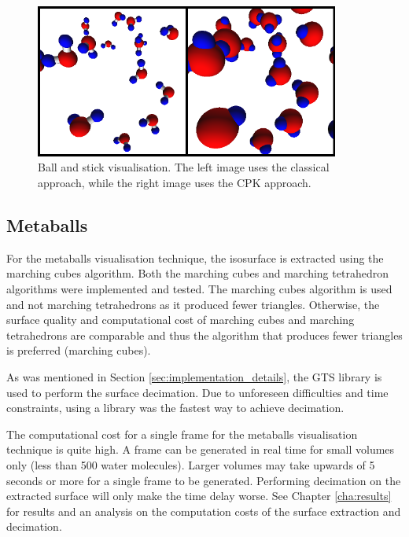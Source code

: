 \begin{figure}[h!]
  \begin{center}
    \includegraphics[width=100mm]{ballstick}
  \end{center}
  \caption{Ball and stick visualisation. The left image uses the classical
  approach, while the right image uses the CPK approach.}
  \label{fig:implementation_ballstick}
\end{figure}


\subsection{Metaballs}
\label{sub:implementation_metaballs}

For the metaballs visualisation technique, the isosurface is extracted using
the marching cubes algorithm. Both the marching cubes and marching tetrahedron
algorithms were implemented and tested. The marching cubes algorithm is used
and not marching tetrahedrons as it produced fewer triangles. Otherwise, the
surface quality and computational cost of marching cubes and marching
tetrahedrons are comparable and thus the algorithm that produces fewer
triangles is preferred (marching cubes).

As was mentioned in Section \ref{sec:implementation_details}, the GTS library
is used to perform the surface decimation. Due to unforeseen difficulties and
time constraints, using a library was the fastest way to achieve decimation.

The computational cost for a single frame for the metaballs visualisation
technique is quite high. A frame can be generated in real time for small
volumes only (less than 500 water molecules). Larger volumes may take upwards
of 5 seconds or more for a single frame to be generated. Performing decimation
on the extracted surface will only make the time delay worse. See Chapter
\ref{cha:results} for results and an analysis on the computation costs of the
surface extraction and decimation.

